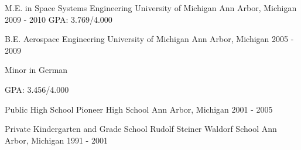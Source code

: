 


\begin{cventries}


\cventry
{M.E. in Space Systems Engineering}
{University of Michigan}
{Ann Arbor, Michigan}
{2009 - 2010}
{GPA: 3.769/4.000}

\cventry
{B.E. Aerospace Engineering}
{University of Michigan}
{Ann Arbor, Michigan}
{2005 - 2009}
{\begin{cvitems}
\item {Minor in German}
\item {GPA: 3.456/4.000}
\end{cvitems}
}

\cventry
{Public High School}
{Pioneer High School}
{Ann Arbor, Michigan}
{2001 - 2005}{}

\cventry
{Private Kindergarten and Grade School}
{Rudolf Steiner Waldorf School}
{Ann Arbor, Michigan}
{1991 - 2001}{}


\end{cventries}
